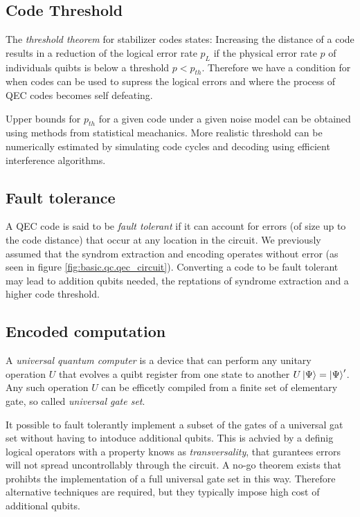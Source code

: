 \subsection{Code Threshold}
The \textit{threshold theorem} for stabilizer codes states:
Increasing the distance of a code results in a reduction of the logical error rate $p_L$ 
if the physical error rate $p$ of individuals quibts is below a threshold $p<p_{th}$.
Therefore we have a condition for when codes can be used to supress the logical errors and where the process of QEC codes becomes self defeating. \cite{QECintro}

Upper bounds for $p_{th}$ for a given code under a given noise model can be obtained using methods from statistical meachanics.
More realistic threshold can be numerically estimated by simulating code cycles and decoding using efficient interference algorithms. \cite{QECintro}

\subsection{Fault tolerance}

A QEC code is said to be \textit{fault tolerant} if it can account for errors (of size up to the code distance) that occur at any location in the circuit.
We previously assumed that the syndrom extraction and encoding operates without error (as seen in figure \ref{fig:basic.qc.qec_circuit}).
Converting a code to be fault tolerant may lead to addition qubits needed, the reptations of syndrome extraction and a higher code threshold. \cite{QECintro}


\subsection{Encoded computation}
A \textit{universal quantum computer} is a device that can perform any unitary operation $U$ that evolves a quibt register from one state to another $U\ket{\Psi} = \ket{\Psi}'$.
Any such operation $U$ can be efficetly compiled from a finite set of elementary gate, so called \textit{universal gate set}. \cite{QECintro}

It possible to fault tolerantly implement a subset of the gates of a universal gat set without having to intoduce additional qubits. 
This is achvied by a definig logical operators with a property knows as \textit{transversality}, that gurantees errors will not spread uncontrollably through the circuit.
A no-go theorem exists that prohibts the implementation of a full universal gate set in this way. 
Therefore alternative techniques are required, but they typically impose high cost of additional qubits. \cite{QECintro}




